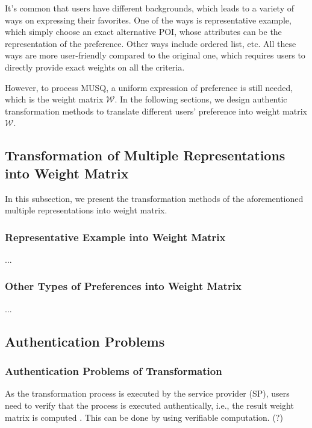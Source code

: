 \documentclass[10pt, conference, compsocconf]{IEEEtran}
\begin{document}
It's common that users have different backgrounds, which leads to a variety of ways on expressing their favorites. One of the ways is representative example, which simply choose an exact alternative POI, whose attributes can be the representation of the preference. Other ways include ordered list, etc. All these ways are more user-friendly compared to the original one, which requires users to directly provide exact weights on all the criteria.

However, to process MUSQ, a uniform expression of preference is still needed, which is the weight matrix $\mathcal{W}$. In the following sections, we design authentic transformation methods to translate different users' preference into weight matrix $\mathcal{W}$. 

\subsection{Transformation of Multiple Representations into Weight Matrix}

In this subsection, we present the transformation methods of the aforementioned multiple representations into weight matrix.

\subsubsection{Representative Example into Weight Matrix}

...

\subsubsection{Other Types of Preferences into Weight Matrix}

...

\subsection{Authentication Problems}

\subsubsection{Authentication Problems of Transformation}

As the transformation process is executed by the service provider (SP), users need to verify that the process is executed authentically, i.e., the result weight matrix is computed . This can be done by using verifiable computation. (?)
\end{document}
